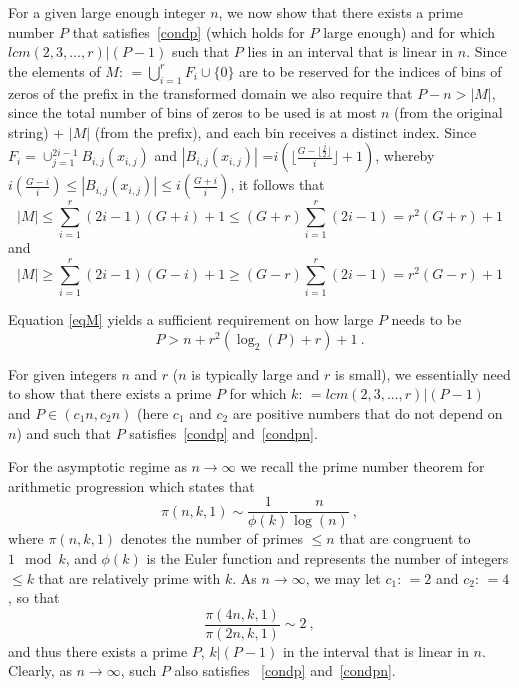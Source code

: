 \documentclass[12pt]{article} \pagestyle{plain} \topmargin
\newcommand{\asn}{\ensuremath{:\,=}}
\begin{document}
 For a given large enough integer $n$, we now show that
there exists a prime number $P$ that satisfies~\eqref{condp} (which
holds for $P$ large enough) and for which $lcm(2,3,...,r) | (P-1)$
such that $P$ lies in an interval that is linear in $n$. Since the
elements of $M \asn \bigcup_{i=1}^r F_i \cup \{0\}$ are to be
reserved for the indices of bins of zeros of the prefix in the
transformed domain we also require that $P-n > |M|$, since the total
number of bins of zeros to be used is at most $n$ (from the original
string) + $|M|$ (from the prefix), and each bin receives a distinct
index. Since $F_i= \cup_{j=1}^{2i-1} B_{i,j}(x_{i,j})$ and
$|B_{i,j}(x_{i,j})|$ =$i\left( \lfloor \frac{G-\lfloor
\frac{j}{2}\rfloor}{i}\rfloor+1\right)$, whereby $i\left(\frac
{G-i}{i}\right) \leq |B_{i,j}(x_{i,j})|\leq i
\left(\frac{G+i}{i}\right)$, it follows that
\begin{equation}\label{eqM} |M| \leq \sum_{i=1}^r (2i-1)(G+i) +1
\leq (G+r) \sum_{i=1}^r (2i-1) =r^2(G+r)+1\end{equation} and
\begin{equation}\label{eqM2} |M| \geq \sum_{i=1}^r (2i-1)(G-i) +1
\geq  (G-r) \sum_{i=1}^r (2i-1) =r^2(G-r)+1\end{equation}


Equation \eqref{eqM} yields a sufficient requirement on how large
$P$ needs to be
\begin{equation}\label{condpn}P>n+r^2(\log_2(P)+r)+1~.
\end{equation}

For given integers $n$ and $r$ ($n$ is typically large and $r$ is
small), we essentially need to show that there exists a prime $P$
for which $k \asn lcm(2,3,...,r) | (P-1)$ and $P \in (c_1n,c_2n)$
(here $c_1$ and $c_2$ are positive numbers that do not depend on
$n$) and such that $P$ satisfies~\eqref{condp} and~\eqref{condpn}.

For the asymptotic regime as $n \rightarrow \infty$ we recall the
prime number theorem for arithmetic progression \cite{sopro} which
states that
\begin{equation}
\pi(n,k,1) \sim \frac{1}{\phi(k)} \frac{n}{\log(n)}~,
\end{equation}
where $\pi(n,k,1)$ denotes the number of primes $\leq n$ that are
congruent to $1 \mod k$, and $\phi(k)$ is the Euler function and
represents the number of integers $\leq k$ that are relatively
prime with $k$. As $n \rightarrow \infty$, we may let $c_1 \asn 2$
and $c_2 \asn 4$, so that
\begin{equation}
\frac{\pi(4n,k,1)}{\pi(2n,k,1)} \sim 2~,
\end{equation}
and thus there exists a prime $P$, $k | (P-1)$ in the interval
that is linear in $n$. Clearly, as $n \rightarrow \infty$, such
$P$ also satisfies ~\eqref{condp} and~\eqref{condpn}.
\end{document}
